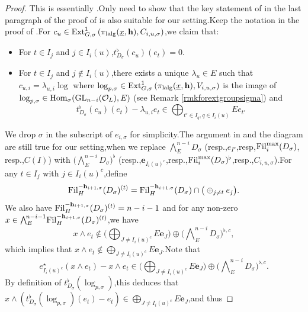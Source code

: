 \documentclass[10pt]{article}
\newcommand{\fil}{{\rm Fil}}
\newcommand{\homo}{{\rm Hom}}
\newcommand{\ext}{{\rm Ext}}
\newcommand{\GLN}{{\rm GL}}
\newcommand{\lalg}{{\rm lalg}}
\newcommand{\be}{{\mathbf{e}}}
\newcommand{\bh}{{\mathbf{h}}}
\newcommand{\cO}{\mathcal O}
\begin{document}
\begin{proof}
This is essentially \cite[Proposition 2.5.4]{BDcritical25}.\;Only need to show that the key statement of  \cite[Lemma 2.2.9 (iii)]{BDcritical25} in the last paragraph of the proof of \cite[Proposition 2.5.4]{BDcritical25} is also suitable for our setting.\;Keep the notation in the proof of \cite[Proposition 2.5.4]{BDcritical25}.\;For $c_u\in \ext^1_{G,\sigma}\left(\pi_{\lalg}(\underline{x},\bh),C_{i,u,\sigma}\right)$,\;we claim that: 
\begin{itemize}
	\item[(1)] For $t\in I_j$ and $j\in I_i(u)$,\;$t^{\flat}_{D_{\sigma}}(c_u)(e_t)=0$.\;
	\item[(2)] For $t\in I_j$ and $j\not\in I_i(u)$,\;there exists a unique $\lambda_u\in E$ such that $c_{u,i}=\lambda_{u,i}\log$ where $\log_{p,\sigma}\in \ext^1_{G,\sigma}\left(\pi_{\lalg}(\underline{x},\bh),V_{i,u,\sigma}\right)$ is the image of $\log_{p,\sigma}\in \homo_{\sigma}(\GLN_{n-i}(\cO_L),E)$ (see Remark \ref{rmkforextgroupsigma}) and 
	\[t^{\flat}_{D_{\sigma}}(c_u)(e_t)-\lambda_{u,i}e_t\in\bigoplus_{t'\in I_{q},q\in I_i(u)}Ee_{t'}\]
\end{itemize}
We drop $\sigma$ in the subscript of $e_{i,\sigma}$ for simplicity.\;The argument in \cite[Page 33]{BDcritical25} and the diagram \cite[(78)]{BDcritical25} are still true for our setting,\;when we replace $\bigwedge\nolimits_E^{\!n-i}\!D_{\sigma}$ (resp.,\;$e_{I^c}$,\;resp,\;$\fil_i^{\max}(D_{\sigma})$, resp.,\;$C(I)$) with $\big(\bigwedge\nolimits_{E}^{\!n-i}\!D_{\sigma}\big)^{\flat}$ (resp.,\;$\be_{I_i(u)^c}$,\;resp.,\;$\fil_i^{\max}(D_{\sigma})^{\flat}$,\;resp.,\;$C_{i,u,\sigma}$).\;For any $t\in I_j$ with $j\in I_i(u)^c$,\;define 
\[\fil_H^{-\bh_{i+1,\sigma}}(D_{\sigma})^{(t)}=\fil_H^{-\bh_{i+1,\sigma}}(D_{\sigma})\cap\big(\oplus_{j\neq t}e_{j}\big).\]
We also have $\fil_H^{-\bh_{i+1,\sigma}}(D_{\sigma})^{(t)}=n-i-1$ and for any non-zero $x\in \bigwedge\nolimits_E^{\!n-i-1}\!\fil_H^{-\bh_{i+1,\sigma}}(D_{\sigma})^{(t)}$,\;we have 
\[x\wedge e_t\notin \Big(\bigoplus_{J\neq I_i(u)^c}E\be_J\Big)\oplus \big(\bigwedge\nolimits_{E}^{\!n-i}\!D_{\sigma}\big)^{\flat,c},\]
which implies that $x\wedge e_t\notin \bigoplus_{J\neq I_i(u)^c}E\be_J$.\;Note that 
\[e^{\star}_{I_i(u)^c}(x\wedge e_t)-x\wedge e_t\in \Big(\bigoplus_{J\neq I_i(u)^c}E\be_J\Big)\oplus \big(\bigwedge\nolimits_{E}^{\!n-i}\!D_{\sigma}\big)^{\flat,c}.\]
By definition of $t^{\flat}_{D_{\sigma}}(\log_{p,\sigma})$,\;this deduces that $x\wedge (t^{\flat}_{D_{\sigma}}(\log_{p,\sigma})(e_t)-e_t)\in\bigoplus_{J\neq I_i(u)^c}E\be_J$,\;and thus 

\end{proof}
\end{document}
